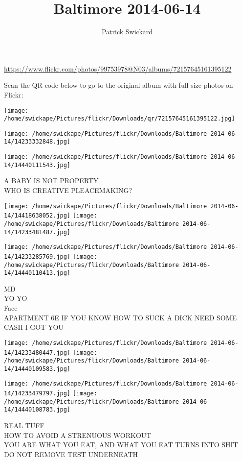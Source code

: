 \documentclass[10pt,letterpaper]{article}
\title{Baltimore 2014-06-14}
\author{Patrick Swickard}
\date{}
\begin{document}
\maketitle

\url{https://www.flickr.com/photos/99753978@N03/albums/72157645161395122}

Scan the QR code below to go to the original album with full-size photos on Flickr:

\texttt{[image: /home/swickape/Pictures/flickr/Downloads/qr/72157645161395122.jpg]}
\pagebreak

\texttt{[image: /home/swickape/Pictures/flickr/Downloads/Baltimore 2014-06-14/14233332848.jpg]}

\vspace{0.25in}
\texttt{[image: /home/swickape/Pictures/flickr/Downloads/Baltimore 2014-06-14/14440111543.jpg]}

A BABY IS NOT PROPERTY\\
WHO IS CREATIVE PLEACEMAKING?
\pagebreak

\texttt{[image: /home/swickape/Pictures/flickr/Downloads/Baltimore 2014-06-14/14418638052.jpg]}
\texttt{[image: /home/swickape/Pictures/flickr/Downloads/Baltimore 2014-06-14/14233481487.jpg]}

\texttt{[image: /home/swickape/Pictures/flickr/Downloads/Baltimore 2014-06-14/14233285769.jpg]}
\texttt{[image: /home/swickape/Pictures/flickr/Downloads/Baltimore 2014-06-14/14440110413.jpg]}

MD\\
YO YO\\
Face\\
APARTMENT 6E IF YOU KNOW HOW TO SUCK A DICK NEED SOME CASH I GOT YOU
\pagebreak

\texttt{[image: /home/swickape/Pictures/flickr/Downloads/Baltimore 2014-06-14/14233480447.jpg]}
\texttt{[image: /home/swickape/Pictures/flickr/Downloads/Baltimore 2014-06-14/14440109583.jpg]}

\texttt{[image: /home/swickape/Pictures/flickr/Downloads/Baltimore 2014-06-14/14233479797.jpg]}
\texttt{[image: /home/swickape/Pictures/flickr/Downloads/Baltimore 2014-06-14/14440108783.jpg]}

REAL TUFF\\
HOW TO AVOID A STRENUOUS WORKOUT\\
YOU ARE WHAT YOU EAT, AND WHAT YOU EAT TURNS INTO SHIT\\
DO NOT REMOVE TEST UNDERNEATH
\pagebreak
\end{document}
